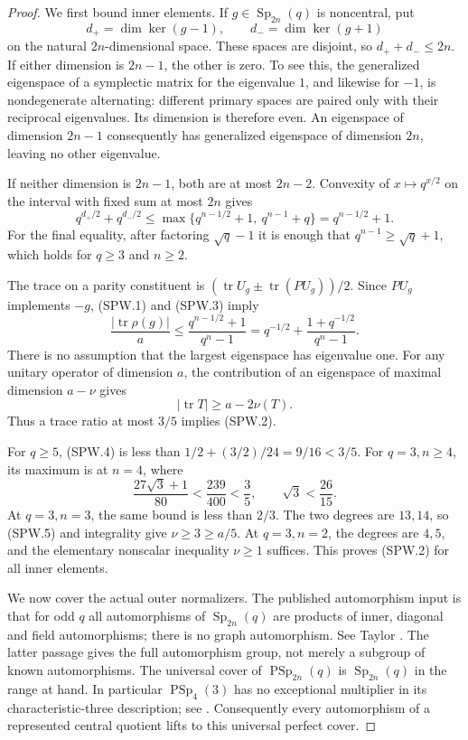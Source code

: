 \begin{proof}
We first bound inner elements.  If $g\in\operatorname{Sp}_{2n}(q)$
is noncentral, put
\[
 d_+=\dim\ker(g-1),\qquad d_-=\dim\ker(g+1)
\]
on the natural $2n$-dimensional space.  These spaces are disjoint,
so $d_++d_-\le2n$.  If either dimension is $2n-1$, the other is
zero.  To see this, the generalized eigenspace of a symplectic
matrix for the eigenvalue $1$, and likewise for $-1$, is
nondegenerate alternating: different primary spaces are paired
only with their reciprocal eigenvalues.  Its dimension is
therefore even.  An eigenspace of dimension $2n-1$ consequently
has generalized eigenspace of dimension $2n$, leaving no other
eigenvalue.

If neither dimension is $2n-1$, both are at most $2n-2$.
Convexity of $x\mapsto q^{x/2}$ on the interval with fixed sum
at most $2n$ gives
\[
 q^{d_+/2}+q^{d_-/2}
 \le\max\{q^{n-1/2}+1,\ q^{n-1}+q\}
 =q^{n-1/2}+1.                                             \tag{SPW.3}
\]
For the final equality, after factoring $\sqrt q-1$ it is
enough that $q^{n-1}\ge\sqrt q+1$, which holds for $q\ge3$
and $n\ge2$.

The trace on a parity constituent is
$(\operatorname{tr}U_g\pm\operatorname{tr}(PU_g))/2$.
Since $PU_g$ implements $-g$, (SPW.1) and (SPW.3) imply
\[
 \frac{|\operatorname{tr}\rho(g)|}{a}
 \le \frac{q^{n-1/2}+1}{q^n-1}
 =q^{-1/2}+\frac{1+q^{-1/2}}{q^n-1}.                       \tag{SPW.4}
\]
There is no assumption that the largest eigenspace has eigenvalue
one.  For any unitary operator of dimension $a$, the contribution
of an eigenspace of maximal dimension $a-\nu$ gives
\[
        |\operatorname{tr}T|\ge a-2\nu(T).                \tag{SPW.5}
\]
Thus a trace ratio at most $3/5$ implies (SPW.2).

For $q\ge5$, (SPW.4) is less than
$1/2+(3/2)/24=9/16<3/5$.  For $q=3,n\ge4$, its maximum
is at $n=4$, where
\[
 \frac{27\sqrt3+1}{80}
 <\frac{239}{400}<\frac35,
 \qquad \sqrt3<\frac{26}{15}.                              \tag{SPW.6}
\]
At $q=3,n=3$, the same bound is less than $2/3$.
The two degrees are $13,14$, so (SPW.5) and integrality give
$\nu\ge3\ge a/5$.  At $q=3,n=2$, the degrees are $4,5$,
and the elementary nonscalar inequality $\nu\ge1$ suffices.
This proves (SPW.2) for all inner elements.

We now cover the actual outer normalizers.  The published
automorphism input is that for odd $q$ all automorphisms of
$\operatorname{Sp}_{2n}(q)$ are products of inner, diagonal and
field automorphisms; there is no graph automorphism.
See Taylor \cite[\S1.5, author p.~2; \S12.5, author p.~24]
{SPW:Taylor}.  The latter passage gives the full automorphism
group, not merely a subgroup of known automorphisms.  The
universal cover of $\operatorname{PSp}_{2n}(q)$ is
$\operatorname{Sp}_{2n}(q)$ in the range at hand.  In particular
$\operatorname{PSp}_4(3)$ has no exceptional multiplier in its
characteristic-three description; see
\cite[Chapter~5, Table~1 and preceding paragraph, numbered p.~35]
{BI:HHM}.  Consequently every automorphism of a represented
central quotient lifts to this universal perfect cover.


\end{proof}
